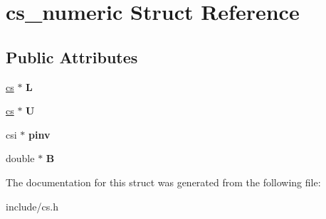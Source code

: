 \hypertarget{structcs__numeric}{\section{cs\+\_\+numeric Struct Reference}
\label{structcs__numeric}
}
\subsection*{Public Attributes}
\begin{DoxyCompactItemize}
\item 
\hypertarget{structcs__numeric_a93a8cf26f01d3df51b41acc690f120d7}{\hyperlink{structcs__sparse}{cs} $\ast$ {\bfseries L}}\label{structcs__numeric_a93a8cf26f01d3df51b41acc690f120d7}

\item 
\hypertarget{structcs__numeric_a1e07204edb10064ca1e471289fced1cb}{\hyperlink{structcs__sparse}{cs} $\ast$ {\bfseries U}}\label{structcs__numeric_a1e07204edb10064ca1e471289fced1cb}

\item 
\hypertarget{structcs__numeric_a30fd2e151d4170f569260261bb18d955}{csi $\ast$ {\bfseries pinv}}\label{structcs__numeric_a30fd2e151d4170f569260261bb18d955}

\item 
\hypertarget{structcs__numeric_ad81bc354670c58c7e715293e98316152}{double $\ast$ {\bfseries B}}\label{structcs__numeric_ad81bc354670c58c7e715293e98316152}

\end{DoxyCompactItemize}


The documentation for this struct was generated from the following file\+:\begin{DoxyCompactItemize}
\item 
include/cs.\+h\end{DoxyCompactItemize}
